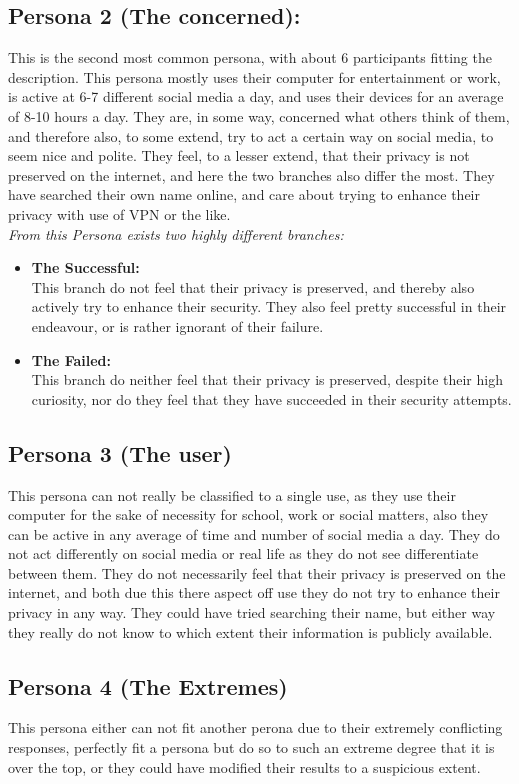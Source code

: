 \subsection{Persona 2 (The concerned):}
This is the second most common persona, with about 6 participants fitting the description.
This persona mostly uses their computer for entertainment or work, is active at 6-7 different social media a day,
and uses their devices for an average of 8-10 hours a day.
They are, in some way, concerned what others think of them, and therefore also, to some extend, try to act a certain way on social media, to seem nice and polite.
They feel, to a lesser extend, that their privacy is not preserved on the internet, and here the two branches also differ the most.
They have searched their own name online, and care about trying to enhance their privacy with use of VPN or the like.\\

\textit{From this Persona exists two highly different branches:}
\begin{itemize}
    \item 
    \textbf{The Successful:}\\
    This branch do not feel that their privacy is preserved, and thereby also actively try to enhance their security. They also feel pretty successful in their endeavour, or is rather ignorant of their failure.
    \item 
    \textbf{The Failed:}\\
    This branch do neither feel that their privacy is preserved, despite their high curiosity, nor do they feel that they have succeeded in their security attempts.
\end{itemize}

\subsection{Persona 3 (The user)}
This persona can not really be classified to a single use, as they use their computer for the sake of necessity for school, work or social matters, also they can be active in any average of time and number of social media a day.
They do not act differently on social media or real life as they do not see differentiate between them.
They do not necessarily feel that their privacy is preserved on the internet, and both due this there aspect off use they do not try to enhance their privacy in any way.
They could have tried searching their name, but either way they really do not know to which extent their information is publicly available.

\subsection{Persona 4 (The Extremes)}
This persona either can not fit another perona due to their extremely conflicting responses, perfectly fit a persona but do so to such an extreme degree that it is over the top, or they could have modified their results to a suspicious extent.